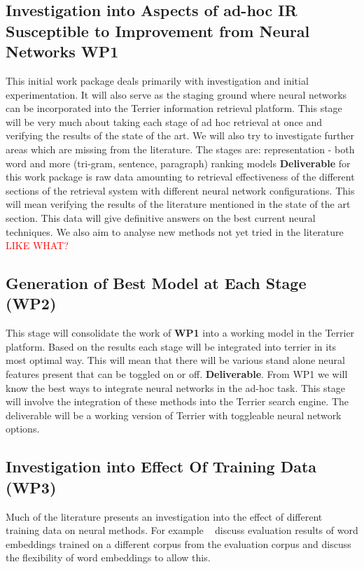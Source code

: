 \documentclass[11pt,english,twocolumn]{article}
\let\oldcite=\cite
\renewcommand\cite[1]{\ifthenelse{\equal{#1}{NEEDED}}{\ensuremath{^\texttt{[citation~needed]}}}{\oldcite{#1}}}
\newcommand{\remove}[1]{\textcolor{red}{#1}}
\begin{document}
\subsection{Investigation into Aspects of ad-hoc IR Susceptible to Improvement from Neural Networks \textbf{WP1}}
This initial work package deals primarily with investigation and initial experimentation. 
It will also serve as the staging ground where neural networks can be incorporated into the Terrier information retrieval platform.
This stage will be very much about taking each stage of ad hoc retrieval at once and verifying the results of the state of the art.
We will also try to investigate further areas which are missing from the literature.
The stages are:
representation - both word and more (tri-gram, sentence, paragraph)
ranking models
\textbf{Deliverable} for this work package is raw data amounting to retrieval effectiveness of the different sections of the retrieval system with different neural network configurations. This will mean verifying the results of the literature mentioned in the state of the art section. This data will give definitive answers on the best current neural techniques. We also aim to analyse new methods not yet tried in the literature \remove{ LIKE WHAT? }

\subsection{Generation of Best Model at Each Stage (\textbf{WP2})}
This stage will consolidate the work of \textbf{WP1} into a working model in the Terrier platform. Based on the results each stage will be integrated into terrier in its most optimal way. This will mean that there will be various stand alone neural features present that can be toggled on or off. \textbf{Deliverable}. From WP1 we will know the best ways to integrate neural networks in the ad-hoc task. This stage will involve the integration of these methods into the Terrier search engine. The deliverable will be a working version of Terrier with toggleable neural network options.

\subsection{Investigation into Effect Of Training Data (\textbf{WP3})}
Much of the literature presents an investigation into the effect of different training data on neural methods. For example ~\cite{} discuss evaluation results of word embeddings trained on a different corpus from the evaluation corpus and discuss the flexibility of word embeddings to allow this.
\end{document}
